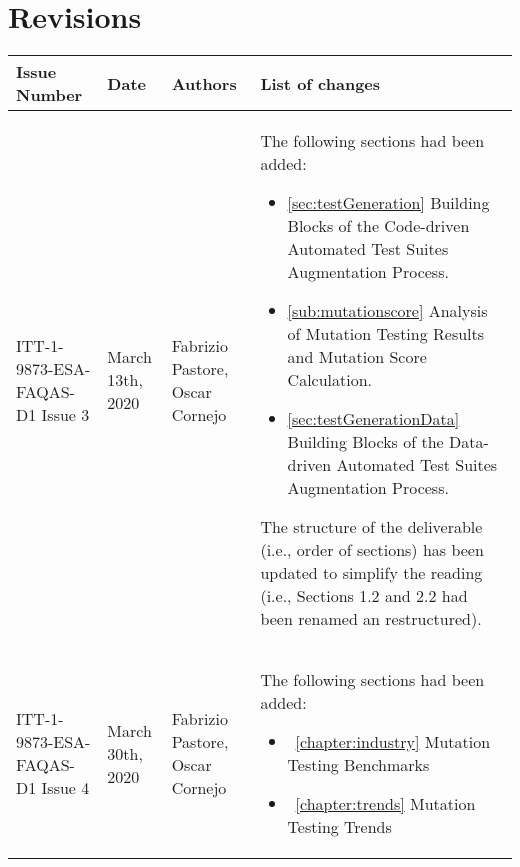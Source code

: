 
\section*{Revisions}
\label{sec:revisions}


\setlength\LTleft{0pt}
\setlength\LTright{0pt}
\tiny 
\begin{longtable}{|p{2cm}|p{1cm}|p{1.5cm}|p{9cm}|@{}}
\label{table:codeoperators} \\
\hline
\textbf{Issue Number}&\textbf{Date}&\textbf{Authors}&\textbf{List of changes}\\
\hline
ITT-1-9873-ESA-FAQAS-D1
Issue 3&
March 13th, 2020&
Fabrizio Pastore, Oscar Cornejo&
\begin{minipage}{8cm}
The following sections had been added:
\begin{itemize}
\item \ref{sec:testGeneration} Building Blocks of the Code-driven Automated Test Suites Augmentation Process.
\item \ref{sub:mutationscore} Analysis of Mutation Testing Results and Mutation Score Calculation.
\item \ref{sec:testGenerationData} Building Blocks of the Data-driven Automated Test Suites Augmentation Process.
\end{itemize}

The structure of the deliverable (i.e., order of sections) has been updated to simplify the reading (i.e., Sections 1.2 and 2.2 had been renamed an restructured).
\end{minipage}
\\
\hline
ITT-1-9873-ESA-FAQAS-D1
Issue 4
&March 30th, 2020
&Fabrizio Pastore, Oscar Cornejo
&
\begin{minipage}{8cm}
The following sections had been added:

\begin{itemize}
	\item~\ref{chapter:industry} Mutation Testing Benchmarks
	\item~\ref{chapter:trends} Mutation Testing Trends
\end{itemize}




\end{minipage}
\end{longtable}
